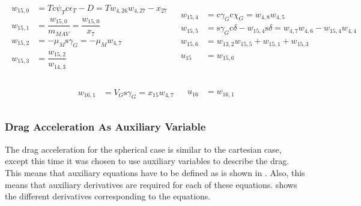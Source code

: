 \begin{align} \label{eq:auxF15}
\begin{split}
w_{15,0} &= T \text{c}\psi_{T} \text{c}\epsilon_{T}-D = Tw_{4,26}w_{4,27}-x_{27} \\
w_{15,1} &= \dfrac{w_{15,0}}{m_{MAV}} = \dfrac{w_{15,0}}{x_{7}} \\
w_{15,2} &= -\mu_{M} \text{s}\gamma_{G} = -\mu_{M}w_{4,7} \\
w_{15,3} &= \dfrac{w_{15,2}}{w_{14,3}} \\
\end{split}
&
\begin{split}
w_{15,4} &= \text{c}\gamma_{G}\text{c}\chi_{G} = w_{4,8}w_{4,5} \\
w_{15,5} &= \text{s}\gamma_{G} \text{c}\delta - w_{15,4} \text{s}\delta = w_{4,7}w_{4,6}-w_{15,4}w_{4,4} \\
w_{15,6} &= w_{13,2}w_{15,5}+w_{15,1}+w_{15,3} \\
\\
u_{15} &= w_{15,6} \\
\end{split}
\end{align}

\begin{align} \label{eq:auxF16}
\begin{split}
w_{16,1} &= V_{G} \text{s}\gamma_{G} = x_{15}w_{4,7} \\
\end{split}
&
\begin{split}
u_{16} &= w_{16,1} \\
\end{split}
\end{align}




 
 \subsubsection{Drag Acceleration As Auxiliary Variable}
 \label{subsubsec:tsiDragAuxE}
The drag acceleration for the spherical case is similar to the cartesian case, except this time it was chosen to use auxiliary variables to describe the drag. This means that auxiliary equations have to be defined as is shown in . Also, this means that auxiliary derivatives are required for each of these equations.  shows the different derivatives corresponding to the equations.
 
